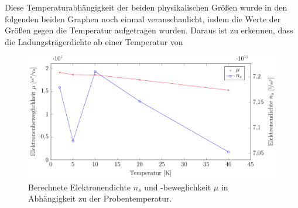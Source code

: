 Diese Temperaturabhängigkeit der beiden physikalischen Größen wurde in den folgenden beiden Graphen noch einmal veranschaulicht, indem die Werte der Größen gegen die Temperatur aufgetragen wurden. %
Daraus ist zu erkennen, dass die Ladungsträgerdichte ab einer Temperatur von %




\begin{figure}[h]
	\centering
	\includegraphics[scale=1]{graphs/temperatur/auswertung.pdf}
	\caption[Auswertung der Temperaturvariation]{
		Berechnete Elektronendichte $n_s$ und -beweglichkeit $\mu$ in Abhängigkeit zu der Probentemperatur.
	}
	\label{fig:temp_ausw}
\end{figure}

